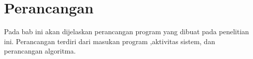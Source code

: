 \chapter{Perancangan}
\label{chap:perancangan}

Pada bab ini akan dijelaskan perancangan program yang dibuat pada penelitian ini. Perancangan terdiri dari masukan program ,aktivitas sistem, dan perancangan algoritma.



